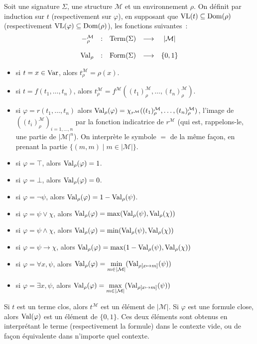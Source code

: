\begin{definition}
  Soit une signature $\Sigma$, une structure $\mathcal M$ et un environnement
  $\rho$. On définit par induction sur $t$ (respectivement sur $\varphi$), en
  supposant que $\operatorname{VL}(t)\subseteq\operatorname{Dom}(\rho)$ (respectivement
  $\operatorname{VL}(\varphi)\subseteq\operatorname{Dom}(\rho)$), les fonctions suivantes~:
  \[\begin{array}{rcccc}
  -_\rho^\mathcal M & : & \operatorname{Term}(\Sigma) & \longrightarrow & |\mathcal M|\\
  \\
  \operatorname{Val}_\rho & : & \operatorname{Form}(\Sigma) & \longrightarrow & \{0,1\}\\
  \end{array}\]

  \begin{itemize}
  \item si $t = x \in \operatorname{Var}$, alors $t^\mathcal M_\rho = \rho(x)$.
  \item si $t = f(t_1,\ldots,t_n)$, alors
    $t_\rho^\mathcal M =
    f^\mathcal M((t_1)^\mathcal M_\rho,\ldots,(t_n)^\mathcal M_\rho)$.
  \item si $\varphi = r(t_1,\ldots,t_n)$ alors
    $\operatorname{Val}_\rho(\varphi) =
    \chi_{r^\mathcal M}((t_1)^\mathcal M_\rho,\ldots,(t_n)^\mathcal M_\rho)$, l'image
    de $((t_i)^\mathcal M_\rho)_{i = 1,\ldots,n}$ par la fonction indicatrice de
    $r^{\mathcal M}$ (qui est, rappelons-le, une partie de $|\mathcal M|^n$).
    On interprète le symbole $=$ de la même façon, en prenant la partie
    $\{(m,m)\mid m\in |\mathcal M|\}$.
  \item si $\varphi = \top$, alors $\operatorname{Val}_\rho(\varphi) = 1$.
  \item si $\varphi = \bot$, alors $\operatorname{Val}_\rho(\varphi) = 0$.
  \item si $\varphi = \lnot \psi$, alors
    $\operatorname{Val}_\rho(\varphi) = 1 - \operatorname{Val}_\rho(\psi)$.
  \item si $\varphi = \psi \lor \chi$, alors
    $\operatorname{Val}_\rho(\varphi) = \max(\operatorname{Val}_\rho(\psi),\operatorname{Val}_\rho(\chi))$
  \item si $\varphi = \psi \land \chi$, alors
    $\operatorname{Val}_\rho(\varphi) = \min(\operatorname{Val}_\rho(\psi),\operatorname{Val}_\rho(\chi))$
  \item si $\varphi = \psi \to \chi$, alors
    $\operatorname{Val}_\rho(\varphi) = \max(1 - \operatorname{Val}_\rho(\psi),\operatorname{Val}_\rho(\chi))$
  \item si $\varphi = \forall x, \psi$, alors
    $\displaystyle\operatorname{Val}_\rho(\varphi) =
    \min_{m \in |\mathcal M|}(\operatorname{Val}_{\rho[x\mapsto m]}(\psi))$
  \item si $\varphi = \exists x, \psi$, alors
    $\displaystyle\operatorname{Val}_\rho(\varphi) =
    \max_{m \in |\mathcal M|}(\operatorname{Val}_{\rho[x\mapsto m]}(\psi))$
  \end{itemize}
  
  Si $t$ est un terme clos, alors $t^{\mathcal M}$ est un élément de
  $|\mathcal M|$. Si $\varphi$ est une formule close, alors $\operatorname{Val}(\varphi)$ est
  un élément de $\{0,1\}$. Ces deux éléments sont obtenus en interprétant le
  terme (respectivement la formule) dans le contexte vide, ou de façon
  équivalente dans n'importe quel contexte.
\end{definition}

